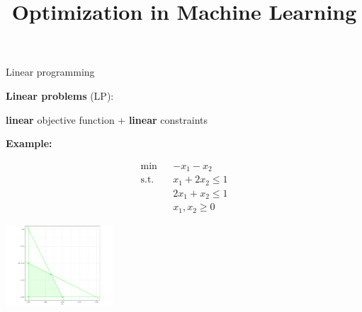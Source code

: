 \documentclass[11pt,compress,t,notes=noshow, xcolor=table]{beamer}
\title{Optimization in Machine Learning}
\begin{document}

\begin{vbframe}{Linear programming}

\textbf{Linear problems} (LP):
\begin{center}
    \textbf{linear} objective function + \textbf{linear} constraints
\end{center}

\textbf{Example:}

\vspace*{-1cm}
\begin{footnotesize}
\begin{eqnarray*}
\min && - x_1 - x_2 \\
\text{s.t. } && x_1 + 2x_2 \le 1\\
&& 2x_1 + x_2 \le 1 \\
&& x_1, x_2 \ge 0
\end{eqnarray*}
\end{footnotesize}

\begin{center}
\includegraphics[width = 0.3\textwidth]{figure_man/cons-linear-pro-example.png}
\end{center}





\end{vbframe}
\end{document}
